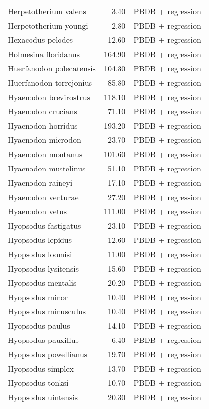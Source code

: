 \begin{table}[ht]
\begin{tabular}{lrl}
  Herpetotherium valens & 3.40 & PBDB + regression \\ 
  Herpetotherium youngi & 2.80 & PBDB + regression \\ 
  Hexacodus pelodes & 12.60 & PBDB + regression \\ 
  Holmesina floridanus & 164.90 & PBDB + regression \\ 
  Huerfanodon polecatensis & 104.30 & PBDB + regression \\ 
  Huerfanodon torrejonius & 85.80 & PBDB + regression \\ 
  Hyaenodon brevirostrus & 118.10 & PBDB + regression \\ 
  Hyaenodon crucians & 71.10 & PBDB + regression \\ 
  Hyaenodon horridus & 193.20 & PBDB + regression \\ 
  Hyaenodon microdon & 23.70 & PBDB + regression \\ 
  Hyaenodon montanus & 101.60 & PBDB + regression \\ 
  Hyaenodon mustelinus & 51.10 & PBDB + regression \\ 
  Hyaenodon raineyi & 17.10 & PBDB + regression \\ 
  Hyaenodon venturae & 27.20 & PBDB + regression \\ 
  Hyaenodon vetus & 111.00 & PBDB + regression \\ 
  Hyopsodus fastigatus & 23.10 & PBDB + regression \\ 
  Hyopsodus lepidus & 12.60 & PBDB + regression \\ 
  Hyopsodus loomisi & 11.00 & PBDB + regression \\ 
  Hyopsodus lysitensis & 15.60 & PBDB + regression \\ 
  Hyopsodus mentalis & 20.20 & PBDB + regression \\ 
  Hyopsodus minor & 10.40 & PBDB + regression \\ 
  Hyopsodus minusculus & 10.40 & PBDB + regression \\ 
  Hyopsodus paulus & 14.10 & PBDB + regression \\ 
  Hyopsodus pauxillus & 6.40 & PBDB + regression \\ 
  Hyopsodus powellianus & 19.70 & PBDB + regression \\ 
  Hyopsodus simplex & 13.70 & PBDB + regression \\ 
  Hyopsodus tonksi & 10.70 & PBDB + regression \\ 
  Hyopsodus uintensis & 20.30 & PBDB + regression \\ 

\end{tabular}
\end{table}
